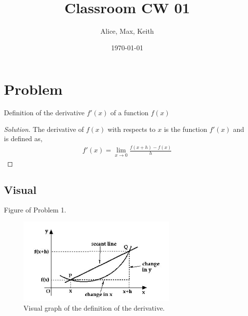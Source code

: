 \documentclass[aps,pra,notitlepage,amsmath,amssymb,letterpaper,12pt]{revtex4-1}
\newenvironment{problem}[2][Problem]{\begin{trivlist}
\item[\hskip \labelsep {\bfseries #1}\hskip \labelsep {\bfseries #2.}]}{\end{trivlist}}
\newenvironment{solution}{\begin{proof}[Solution]}{\end{proof}}
\begin{document}
 
\title{Classroom CW 01}
\author{Alice, Max, Keith}
\date{\today}

\maketitle

\section{Problem} %

\begin{problem}{1} 
Definition of the derivative $f'(x)$ of a function $f(x)$
\end{problem}

\begin{solution} %
The derivative of $f(x)$ with respects to $x$ is the function $f'(x)$ and is defined as,
\begin{align}
f'(x) = \lim\limits_{x \to 0}\frac{f(x+h)-f(x)}{h}
\end{align}
\end{solution}

\subsection{Visual} %

Figure of Problem 1.

\begin{figure}[h!] %
  \includegraphics[width=0.7\textwidth]{limits_and_derivates.JPG}  %
  \caption{Visual graph of the definition of the derivative.}
  \label{fig:figlabel}
\end{figure}
\end{document}
